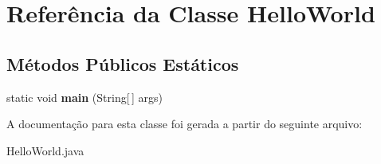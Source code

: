 \hypertarget{classHelloWorld}{\section{Referência da Classe Hello\-World}
\label{classHelloWorld}
}
\subsection*{Métodos Públicos Estáticos}
\begin{DoxyCompactItemize}
\item 
\hypertarget{classHelloWorld_a6ee4fcc2452e2a85be43984f46aceba7}{static void {\bfseries main} (String\mbox{[}$\,$\mbox{]} args)}\label{classHelloWorld_a6ee4fcc2452e2a85be43984f46aceba7}

\end{DoxyCompactItemize}


A documentação para esta classe foi gerada a partir do seguinte arquivo\-:\begin{DoxyCompactItemize}
\item 
Hello\-World.\-java\end{DoxyCompactItemize}
